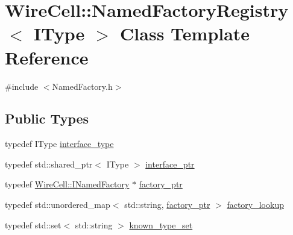 \hypertarget{class_wire_cell_1_1_named_factory_registry}{}\section{Wire\+Cell\+:\+:Named\+Factory\+Registry$<$ I\+Type $>$ Class Template Reference}
\label{class_wire_cell_1_1_named_factory_registry}


{\ttfamily \#include $<$Named\+Factory.\+h$>$}

\subsection*{Public Types}
\begin{DoxyCompactItemize}
\item 
typedef I\+Type \hyperlink{class_wire_cell_1_1_named_factory_registry_aece4420d1fa924bd430e5fc8f2d43066}{interface\+\_\+type}
\item 
typedef std\+::shared\+\_\+ptr$<$ I\+Type $>$ \hyperlink{class_wire_cell_1_1_named_factory_registry_a1098a42a84d98eae7cdb3cc9a0602e38}{interface\+\_\+ptr}
\item 
typedef \hyperlink{class_wire_cell_1_1_i_named_factory}{Wire\+Cell\+::\+I\+Named\+Factory} $\ast$ \hyperlink{class_wire_cell_1_1_named_factory_registry_a4d693bf86f7a8a24ac7dc00d92d929cf}{factory\+\_\+ptr}
\item 
typedef std\+::unordered\+\_\+map$<$ std\+::string, \hyperlink{class_wire_cell_1_1_named_factory_registry_a4d693bf86f7a8a24ac7dc00d92d929cf}{factory\+\_\+ptr} $>$ \hyperlink{class_wire_cell_1_1_named_factory_registry_af53a5c841e67e2e1245849939e5f611e}{factory\+\_\+lookup}
\item 
typedef std\+::set$<$ std\+::string $>$ \hyperlink{class_wire_cell_1_1_named_factory_registry_a166047268e8cb29c0ea05ae35a80db0c}{known\+\_\+type\+\_\+set}
\end{DoxyCompactItemize}
